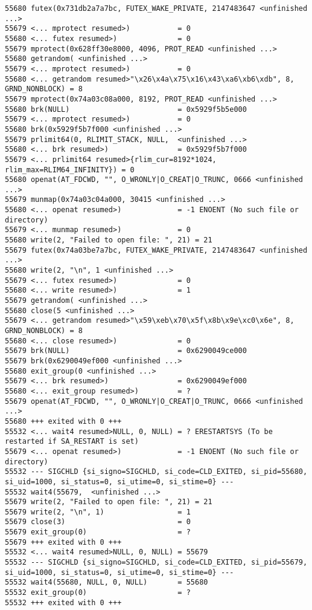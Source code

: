 \begin{verbatim}
55680 futex(0x731db2a7a7bc, FUTEX_WAKE_PRIVATE, 2147483647 <unfinished ...>
55679 <... mprotect resumed>)           = 0
55680 <... futex resumed>)              = 0
55679 mprotect(0x628ff30e8000, 4096, PROT_READ <unfinished ...>
55680 getrandom( <unfinished ...>
55679 <... mprotect resumed>)           = 0
55680 <... getrandom resumed>"\x26\x4a\x75\x16\x43\xa6\xb6\xdb", 8, GRND_NONBLOCK) = 8
55679 mprotect(0x74a03c08a000, 8192, PROT_READ <unfinished ...>
55680 brk(NULL)                         = 0x5929f5b5e000
55679 <... mprotect resumed>)           = 0
55680 brk(0x5929f5b7f000 <unfinished ...>
55679 prlimit64(0, RLIMIT_STACK, NULL,  <unfinished ...>
55680 <... brk resumed>)                = 0x5929f5b7f000
55679 <... prlimit64 resumed>{rlim_cur=8192*1024, rlim_max=RLIM64_INFINITY}) = 0
55680 openat(AT_FDCWD, "", O_WRONLY|O_CREAT|O_TRUNC, 0666 <unfinished ...>
55679 munmap(0x74a03c04a000, 30415 <unfinished ...>
55680 <... openat resumed>)             = -1 ENOENT (No such file or directory)
55679 <... munmap resumed>)             = 0
55680 write(2, "Failed to open file: ", 21) = 21
55679 futex(0x74a03be7a7bc, FUTEX_WAKE_PRIVATE, 2147483647 <unfinished ...>
55680 write(2, "\n", 1 <unfinished ...>
55679 <... futex resumed>)              = 0
55680 <... write resumed>)              = 1
55679 getrandom( <unfinished ...>
55680 close(5 <unfinished ...>
55679 <... getrandom resumed>"\x59\xeb\x70\x5f\x8b\x9e\xc0\x6e", 8, GRND_NONBLOCK) = 8
55680 <... close resumed>)              = 0
55679 brk(NULL)                         = 0x6290049ce000
55679 brk(0x6290049ef000 <unfinished ...>
55680 exit_group(0 <unfinished ...>
55679 <... brk resumed>)                = 0x6290049ef000
55680 <... exit_group resumed>)         = ?
55679 openat(AT_FDCWD, "", O_WRONLY|O_CREAT|O_TRUNC, 0666 <unfinished ...>
55680 +++ exited with 0 +++
55532 <... wait4 resumed>NULL, 0, NULL) = ? ERESTARTSYS (To be restarted if SA_RESTART is set)
55679 <... openat resumed>)             = -1 ENOENT (No such file or directory)
55532 --- SIGCHLD {si_signo=SIGCHLD, si_code=CLD_EXITED, si_pid=55680, si_uid=1000, si_status=0, si_utime=0, si_stime=0} ---
55532 wait4(55679,  <unfinished ...>
55679 write(2, "Failed to open file: ", 21) = 21
55679 write(2, "\n", 1)                 = 1
55679 close(3)                          = 0
55679 exit_group(0)                     = ?
55679 +++ exited with 0 +++
55532 <... wait4 resumed>NULL, 0, NULL) = 55679
55532 --- SIGCHLD {si_signo=SIGCHLD, si_code=CLD_EXITED, si_pid=55679, si_uid=1000, si_status=0, si_utime=0, si_stime=0} ---
55532 wait4(55680, NULL, 0, NULL)       = 55680
55532 exit_group(0)                     = ?
55532 +++ exited with 0 +++
\end{verbatim} 
